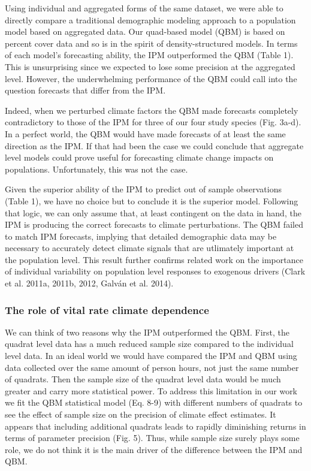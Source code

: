 \documentclass[12pt,]{article}
\begin{document}
Using individual and aggregated forms of the same dataset, we were able
to directly compare a traditional demographic modeling approach to a
population model based on aggregated data. Our quad-based model (QBM) is
based on percent cover data and so is in the spirit of
density-structured models. In terms of each model's forecasting ability,
the IPM outperformed the QBM (Table 1). This is unsurprising since we
expected to lose some precision at the aggregated level. However, the
underwhelming performance of the QBM could call into the question
forecasts that differ from the IPM.

Indeed, when we perturbed climate factors the QBM made forecasts
completely contradictory to those of the IPM for three of our four study
species (Fig. 3a-d). In a perfect world, the QBM would have made
forecasts of at least the same direction as the IPM. If that had been
the case we could conclude that aggregate level models could prove
useful for forecasting climate change impacts on populations.
Unfortunately, this was not the case.

Given the superior ability of the IPM to predict out of sample
observations (Table 1), we have no choice but to conclude it is the
superior model. Following that logic, we can only assume that, at least
contingent on the data in hand, the IPM is producing the correct
forecasts to climate perturbations. The QBM failed to match IPM
forecasts, implying that detailed demographic data may be necessary to
accurately detect climate signals that are utlimately important at the
population level. This result further confirms related work on the
importance of individual variability on population level responses to
exogenous drivers (Clark et al. 2011a, 2011b, 2012, Galván et al. 2014).

\subsubsection{The role of vital rate climate
dependence}\label{the-role-of-vital-rate-climate-dependence}

We can think of two reasons why the IPM outperformed the QBM. First, the
quadrat level data has a much reduced sample size compared to the
individual level data. In an ideal world we would have compared the IPM
and QBM using data collected over the same amount of person hours, not
just the same number of quadrats. Then the sample size of the quadrat
level data would be much greater and carry more statistical power. To
address this limitation in our work we fit the QBM statistical model
(Eq. 8-9) with different numbers of quadrats to see the effect of sample
size on the precision of climate effect estimates. It appears that
including additional quadrats leads to rapidly diminishing returns in
terms of parameter precision (Fig. 5). Thus, while sample size surely
plays some role, we do not think it is the main driver of the difference
between the IPM and QBM.
\end{document}
